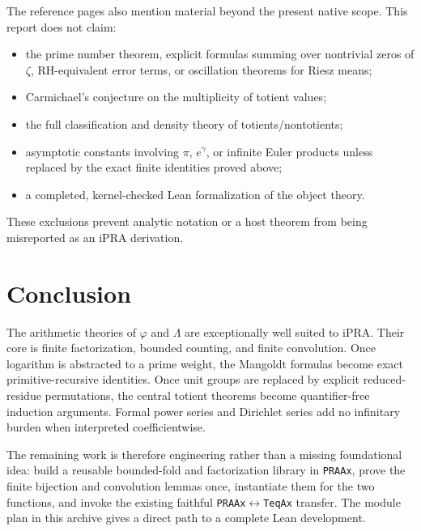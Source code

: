 \documentclass[11pt]{article}
\theoremstyle{definition}
\newcommand{\ipra}{\mathrm{iPRA}}
\newcommand{\code}[1]{\nolinkurl{#1}}
\begin{document}
The reference pages also mention material beyond the present native scope.
This report does not claim:
\begin{itemize}
\item the prime number theorem, explicit formulas summing over nontrivial zeros
of \(\zeta\), RH-equivalent error terms, or oscillation theorems for Riesz
means;
\item Carmichael's conjecture on the multiplicity of totient values;
\item the full classification and density theory of totients/nontotients;
\item asymptotic constants involving \(\pi\), \(e^\gamma\), or infinite Euler
products unless replaced by the exact finite identities proved above;
\item a completed, kernel-checked Lean formalization of the object theory.
\end{itemize}
These exclusions prevent analytic notation or a host theorem from being
misreported as an \(\ipra\) derivation.

\section{Conclusion}

The arithmetic theories of \(\varphi\) and \(\Lambda\) are exceptionally well
suited to \(\ipra\).  Their core is finite factorization, bounded counting,
and finite convolution.  Once logarithm is abstracted to a prime weight, the
Mangoldt formulas become exact primitive-recursive identities.  Once unit
groups are replaced by explicit reduced-residue permutations, the central
totient theorems become quantifier-free induction arguments.  Formal power
series and Dirichlet series add no infinitary burden when interpreted
coefficientwise.

The remaining work is therefore engineering rather than a missing
foundational idea: build a reusable bounded-fold and factorization library in
\code{PRAAx}, prove the finite bijection and convolution lemmas once, instantiate
them for the two functions, and invoke the existing faithful
\code{PRAAx}\(\leftrightarrow\)\code{TeqAx} transfer.  The module plan in this
archive gives a direct path to a complete Lean development.
\end{document}
